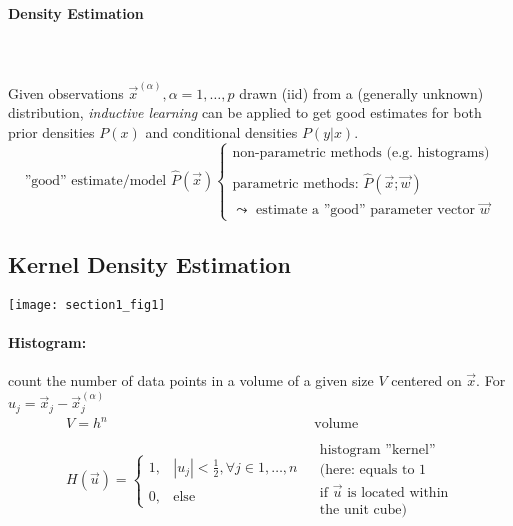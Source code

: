 \paragraph{Density Estimation}\mbox{}\\\\
Given observations $\vec{x}^{(\alpha)}, \alpha = 1, \ldots, p$ drawn
(iid) from a (generally unknown) distribution, \emph{inductive
  learning} can be applied to get good estimates for both prior
densities $P(x)$ and conditional densities $P(y|x)$.
\[ \text{''good'' estimate/model } \widehat{P}(\vec{x})
\left \{ \begin{array}{ll}
	\text{non-parametric methods (e.g. histograms)} \\\\
	\text{parametric methods: } \widehat{P}(\vec{x};\vec{w})\\
	\leadsto \text{ estimate a ''good'' parameter vector } \vec{w}
\end{array} \right. \]


\subsection{Kernel Density Estimation} \label{sec:KDE}
\begin{center}\texttt{[image: section1\_fig1]}
\end{center}

\paragraph{Histogram:} count the number of data points in a volume of a given size $V$ centered on $\vec{x}$. For $u_j=\vec{x}_j - \vec{x}^{(\alpha)}_j $
\begin{equation}
	\begin{array}{ll}
		V = h^n & \text{volume} \\\\
		H(\vec{u}) = \left \{ \begin{array}{ll}
			1, & |u_j| < \frac{1}{2}, \forall j \in 1, \ldots, n \\\\
			0, & \text{else}
			\end{array} \right.
			& \substack{ \text{histogram ''kernel''} \\
				\text{(here: equals to } 1 \\
				\text{if } \vec{u} \text{ is located within}\\
				\text{the unit cube)}}
	\end{array}
\end{equation}

